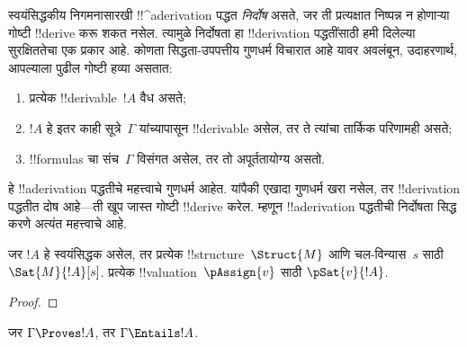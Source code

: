 \documentclass[../../../include/open-logic-section]{subfiles}
\begin{document}
      {}
      {}


\begin{explain}
स्वयंसिद्धकीय निगमनासारखी !!^a{derivation} पद्धत
\emph{निर्दोष} असते, जर ती प्रत्यक्षात निष्पन्न न होणाऱ्या गोष्टी
!!{derive} करू शकत नसेल. त्यामुळे निर्दोषता हा !!{derivation} पद्धतींसाठी
हमी दिलेल्या सुरक्षिततेचा एक प्रकार आहे. कोणता सिद्धता-उपपत्तीय गुणधर्म
विचारात आहे यावर अवलंबून, उदाहरणार्थ, आपल्याला पुढील गोष्टी हव्या असतात:
\begin{enumerate}
\item प्रत्येक !!{derivable}~$!A$ वैध असते;
\item $!A$ हे इतर काही सूत्रे~$\Gamma$ यांच्यापासून !!{derivable} असेल,
  तर ते त्यांचा तार्किक परिणामही असते;
\item !!{formula}s चा संच~$\Gamma$ विसंगत असेल, तर तो अपूर्ततायोग्य असतो.
\end{enumerate}
हे !!a{derivation} पद्धतीचे महत्त्वाचे गुणधर्म आहेत. यांपैकी एखादा गुणधर्म
खरा नसेल, तर !!{derivation} पद्धतीत दोष आहे---ती खूप जास्त गोष्टी
!!{derive} करेल. म्हणून !!a{derivation} पद्धतीची निर्दोषता सिद्ध करणे अत्यंत
महत्त्वाचे आहे.
\end{explain}

\begin{prop}
  जर $!A$ हे स्वयंसिद्धक असेल, तर
    {प्रत्येक !!{structure}~$\Struct{M}$ आणि चल-विन्यास~$s$ साठी $\Sat{M}{!A}[s]$.}
    {प्रत्येक !!{valuation}~$\pAssign{v}$ साठी $\pSat{v}{!A}$.}
\end{prop}

\begin{proof}
\end{proof}

\begin{thm}[निर्दोषता]
जर $\Gamma \Proves !A$, तर $\Gamma \Entails !A$.
\end{thm}
\end{document}
